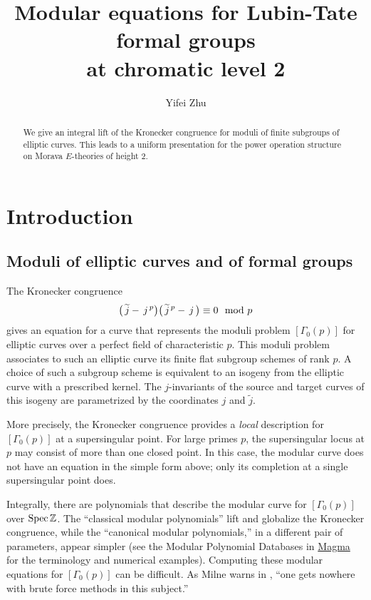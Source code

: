 \documentclass{gtpart}
\title{Modular equations for Lubin-Tate formal groups\\at chromatic level 2}
\author{Yifei Zhu}
\theoremstyle{definition}
\theoremstyle{remark}
\newcommand{\mb}[1]{\mathbb{#1}}
\newcommand{\Spec}{{\rm Spec\thinspace}}
\newcommand{\BZ}{{\mb Z}}
\newcommand{\tj}{\widetilde{j}}
\newcommand{\md}{~~{\rm mod}~}
\newcommand{\G}{\Gamma}
\renewcommand{\=}{\approx}
\renewcommand{\-}{\sim}
\numberwithin{equation}{section}
\begin{document}
\begin{abstract}
 We give an integral lift of the Kronecker congruence for moduli of finite 
 subgroups of elliptic curves.  This leads to a uniform presentation for the 
 power operation structure on Morava $E$-theories of height 2.  
\end{abstract}

\maketitle



\section{Introduction}

\subsection{Moduli of elliptic curves and of formal groups}

The Kronecker congruence 
\begin{equation}
 \label{Kronecker}
 \big(\,\tj - \,j^{\,p}\big) \,\! \big(\,\tj^{\,p} - \,j\,\big) \equiv 0 \md p 
\end{equation}
gives an equation for a curve that represents the moduli problem $[\G_0(p)]$ for 
elliptic curves over a perfect field of characteristic $p$.  This moduli problem 
associates to such an elliptic curve its finite flat subgroup schemes of rank 
$p$.  A choice of such a subgroup scheme is equivalent to an isogeny from the 
elliptic curve with a prescribed kernel.  The $j$-invariants of the source and 
target curves of this isogeny are parametrized by the coordinates $j$ and $\tj$.  

More precisely, the Kronecker congruence provides a {\em local} description for 
$[\G_0(p)]$ at a supersingular point.  For large primes $p$, the supersingular 
locus at $p$ may consist of more than one closed point.  In this case, the 
modular curve does not have an equation in the simple form above; only its 
completion at a single supersingular point does.  

Integrally, there are polynomials that describe the modular curve for 
$[\G_0(p)]$ over $\Spec \BZ$.  The ``classical modular polynomials'' lift and 
globalize the Kronecker congruence, while the ``canonical modular polynomials,'' 
in a different pair of parameters, appear simpler (see the Modular Polynomial 
Databases in \href{http://magma.maths.usyd.edu.au/magma/handbook/modular_curves}
{Magma} for the terminology and numerical examples).  Computing these modular 
equations for $[\G_0(p)]$ can be difficult.  As Milne warns in 
\cite[Section 6]{Milne}, ``one gets nowhere with brute force methods in this 
subject.''  
\end{document}
